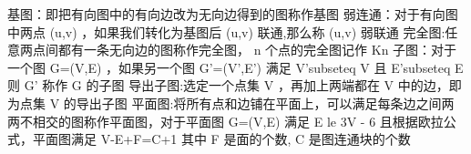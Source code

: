 \markdownRendererDocumentBegin
\markdownRendererSectionBegin
\markdownRendererSectionBegin
{}\markdownRendererInterblockSeparator
{}基图：即把有向图中的有向边改为无向边得到的图称作基图\markdownRendererParagraphSeparator
{}弱连通：对于有向图中两点\markdownRendererDollarSign{} (u,v) \markdownRendererDollarSign{}，如果我们转化为基图后\markdownRendererDollarSign{} (u,v) \markdownRendererDollarSign{}联通,那么称\markdownRendererDollarSign{} (u,v) \markdownRendererDollarSign{}弱联通\markdownRendererParagraphSeparator
{}完全图:任意两点间都有一条无向边的图称作完全图，\markdownRendererDollarSign{} n \markdownRendererDollarSign{}个点的完全图记作\markdownRendererDollarSign{} K\markdownRendererUnderscore{}\markdownRendererLeftBrace{}n\markdownRendererRightBrace{} \markdownRendererDollarSign{}\markdownRendererParagraphSeparator
{}子图：对于一个图\markdownRendererDollarSign{} G=(V,E) \markdownRendererDollarSign{}，如果另一个图\markdownRendererDollarSign{} G\markdownRendererCircumflex{}\markdownRendererLeftBrace{}'\markdownRendererRightBrace{}=(V\markdownRendererCircumflex{}\markdownRendererLeftBrace{}'\markdownRendererRightBrace{},E\markdownRendererCircumflex{}\markdownRendererLeftBrace{}'\markdownRendererRightBrace{}) \markdownRendererDollarSign{}满足\markdownRendererDollarSign{} V\markdownRendererCircumflex{}\markdownRendererLeftBrace{}'\markdownRendererRightBrace{}\markdownRendererBackslash{}subseteq V \markdownRendererDollarSign{}且\markdownRendererDollarSign{} E\markdownRendererCircumflex{}\markdownRendererLeftBrace{}'\markdownRendererRightBrace{}\markdownRendererBackslash{}subseteq E \markdownRendererDollarSign{}则\markdownRendererDollarSign{} G\markdownRendererCircumflex{}\markdownRendererLeftBrace{}'\markdownRendererRightBrace{} \markdownRendererDollarSign{}称作\markdownRendererDollarSign{} G \markdownRendererDollarSign{}的子图\markdownRendererParagraphSeparator
{}导出子图:选定一个点集\markdownRendererDollarSign{} V \markdownRendererDollarSign{}，再加上两端都在\markdownRendererDollarSign{} V \markdownRendererDollarSign{}中的边，即为点集\markdownRendererDollarSign{} V \markdownRendererDollarSign{}的导出子图\markdownRendererParagraphSeparator
{}平面图:将所有点和边铺在平面上，可以满足每条边之间两两不相交的图称作平面图，对于平面图\markdownRendererDollarSign{} G=(V,E) \markdownRendererDollarSign{}满足\markdownRendererDollarSign{} E \markdownRendererBackslash{}le 3V - 6 \markdownRendererDollarSign{} 且根据欧拉公式，平面图满足\markdownRendererDollarSign{} V-E+F=C+1 \markdownRendererDollarSign{}其中\markdownRendererDollarSign{} F \markdownRendererDollarSign{}是面的个数,\markdownRendererDollarSign{} C \markdownRendererDollarSign{}是图连通块的个数\markdownRendererInterblockSeparator
